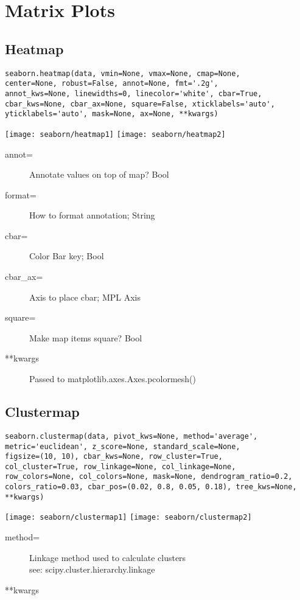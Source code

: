 \section{Matrix Plots}

\subsection{Heatmap}
\begin{verbatim}
seaborn.heatmap(data, vmin=None, vmax=None, cmap=None, 
center=None, robust=False, annot=None, fmt='.2g', 
annot_kws=None, linewidths=0, linecolor='white', cbar=True, 
cbar_kws=None, cbar_ax=None, square=False, xticklabels='auto', 
yticklabels='auto', mask=None, ax=None, **kwargs)
\end{verbatim}
\texttt{[image: seaborn/heatmap1]}
\texttt{[image: seaborn/heatmap2]}
\begin{description}
	\item[annot=] Annotate values on top of map? Bool
	\item[format=] How to format annotation; String
	\item[cbar=] Color Bar key; Bool
	\item[cbar\_ax=] Axis to place cbar; MPL Axis
	\item[square=] Make map items square? Bool
	\item[**kwargs] Passed to matplotlib.axes.Axes.pcolormesh()
\end{description}

\subsection{Clustermap}
\begin{verbatim}
seaborn.clustermap(data, pivot_kws=None, method='average', 
metric='euclidean', z_score=None, standard_scale=None, 
figsize=(10, 10), cbar_kws=None, row_cluster=True, 
col_cluster=True, row_linkage=None, col_linkage=None, 
row_colors=None, col_colors=None, mask=None, dendrogram_ratio=0.2, 
colors_ratio=0.03, cbar_pos=(0.02, 0.8, 0.05, 0.18), tree_kws=None, 
**kwargs)
\end{verbatim}
\texttt{[image: seaborn/clustermap1]}
\texttt{[image: seaborn/clustermap2]}
\begin{description}
	\item[method=] Linkage method used to calculate clusters
		\\see: scipy.cluster.hierarchy.linkage
	\item[**kwargs] 
\end{description}

